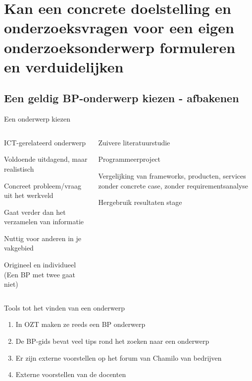 \section{Kan een concrete doelstelling en onderzoeksvragen voor een eigen onderzoeksonderwerp formuleren en verduidelijken}

\sectionframelogo{}

\subsection{Een geldig BP-onderwerp kiezen - afbakenen}
\begin{frame}{Een onderwerp kiezen}
	
	\begin{columns}[c]


		\begin{itemize}
			\item \textcolor{HoGentAccent3}{ICT-gerelateerd onderwerp
			\item Voldoende uitdagend, maar realistisch
			\item Concreet probleem/vraag uit het werkveld
			\item Gaat verder dan het verzamelen van informatie
			\item Nuttig voor anderen in je vakgebied
			\item Origineel en individueel (Een BP met twee gaat niet)}
		\end{itemize}
	
	
	

	\begin{itemize}
		\item \textcolor{HoGentAccent2}{Zuivere literatuurstudie
		\item Programmeerproject
		\item Vergelijking van frameworks, producten, services zonder
		concrete case, zonder requirementsanalyse
		\item  Hergebruik resultaten stage}
	\end{itemize}
		
	\end{columns}	
	
\end{frame}


\begin{frame}{Tools tot het vinden van een onderwerp}
	\begin{enumerate}
		\item In OZT maken ze reeds een BP onderwerp
		\item De BP-gids bevat veel tips rond het zoeken naar een onderwerp
		\item Er zijn externe voorstellen op het forum van Chamilo van bedrijven
		\item \textcolor{HoGentAccent1}{Externe voorstellen van de docenten}
	\end{enumerate}
\end{frame}